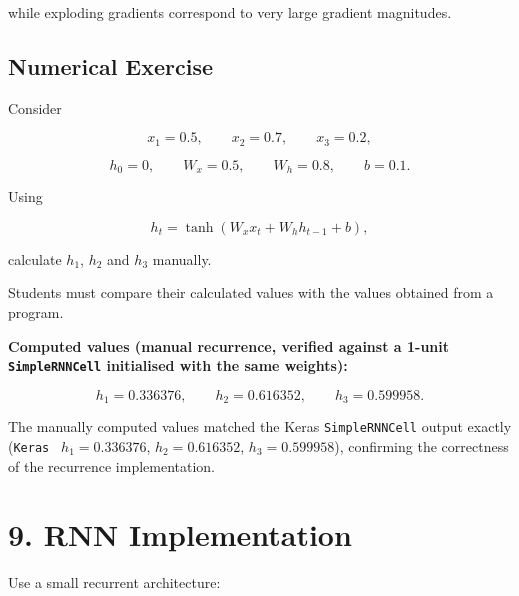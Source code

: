 \documentclass[10pt]{article}
\begin{document}
while exploding gradients correspond to very large gradient magnitudes.

\subsection*{Numerical Exercise}

Consider

\[
x_1=0.5,\qquad x_2=0.7,\qquad x_3=0.2,
\]

\[
h_0=0,\qquad W_x=0.5,\qquad W_h=0.8,\qquad b=0.1.
\]

Using

\[
h_t=\tanh(W_xx_t+W_hh_{t-1}+b),
\]

calculate $h_1$, $h_2$ and $h_3$ manually.

Students must compare their calculated values with the values obtained from
a program.

\textbf{Computed values (manual recurrence, verified against a 1-unit
\texttt{SimpleRNNCell} initialised with the same weights):}

\[
h_1 = 0.336376,\qquad h_2 = 0.616352,\qquad h_3 = 0.599958.
\]

The manually computed values matched the Keras \texttt{SimpleRNNCell} output
exactly (\texttt{Keras } $h_1=0.336376$, $h_2=0.616352$, $h_3=0.599958$),
confirming the correctness of the recurrence implementation.

\section*{9. RNN Implementation}

Use a small recurrent architecture:

\begin{center}
\end{center}
\end{document}
